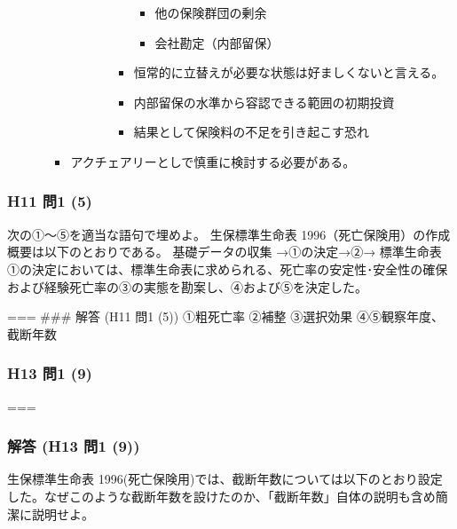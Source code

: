 \documentclass[
]{article}
\providecommand{\tightlist}{%
  \setlength{\itemsep}{0pt}\setlength{\parskip}{0pt}}
\begin{document}
\begin{itemize}
\begin{itemize}
\begin{itemize}
\begin{itemize}
\begin{itemize}
\begin{itemize}
            \begin{itemize}
            \tightlist
            \item
              他の保険群団の剰余
            \item
              会社勘定（内部留保）
            \end{itemize}
          \item
            恒常的に立替えが必要な状態は好ましくないと言える。
          \item
            内部留保の水準から容認できる範囲の初期投資
          \item
            結果として保険料の不足を引き起こす恐れ
          \end{itemize}
        \end{itemize}
      \end{itemize}
    \item
      アクチェアリーとしで慎重に検討する必要がある。
    \end{itemize}
  \end{itemize}
\end{itemize}

\hypertarget{h11-ux554f1-5}{%
\subsubsection{H11 問1 (5)}\label{h11-ux554f1-5}}

次の①～⑤を適当な語句で埋めよ。 生保標準生命表
1996（死亡保険用）の作成概要は以下のとおりである。 基礎データの収集
→①の決定→②→ 標準生命表
①の決定においては、標準生命表に求められる、死亡率の安定性･安全性の確保および経験死亡率の③の実態を勘案し、④および⑤を決定した。

=== \#\#\# 解答 (H11 問1 (5)) ①粗死亡率 ②補整 ③選択効果
④⑤観察年度、截断年数

\hypertarget{h13-ux554f1-9}{%
\subsubsection{H13 問1 (9)}\label{h13-ux554f1-9}}

===

\hypertarget{ux89e3ux7b54-h13-ux554f1-9}{%
\subsubsection{解答 (H13 問1 (9))}\label{ux89e3ux7b54-h13-ux554f1-9}}

生保標準生命表
1996(死亡保険用)では、截断年数については以下のとおり設定した。なぜこのような截断年数を設けたのか、「截断年数」自体の説明も含め簡潔に説明せよ。
\end{document}
